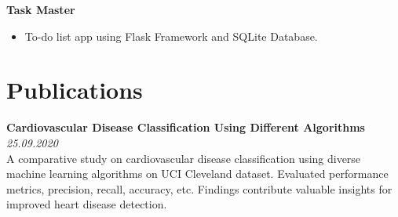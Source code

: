 \documentclass[a4paper,10pt]{article}
\begin{document}
\textbf{Task Master}
\begin{itemize}
    \item To-do list app using Flask Framework and SQLite Database.
\end{itemize}

\section*{Publications}
\textbf{Cardiovascular Disease Classification Using Different Algorithms}\\
\emph{25.09.2020}\\
A comparative study on cardiovascular disease classification using diverse machine learning algorithms on UCI Cleveland dataset. Evaluated performance metrics, precision, recall, accuracy, etc. Findings contribute valuable insights for improved heart disease detection.
\end{document}
